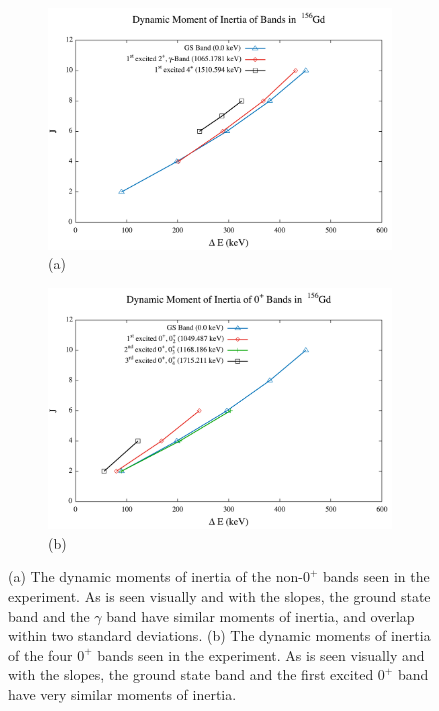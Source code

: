 \begin{figure}[!]
    \begin{subfigure}{\textwidth}
    \centering
    \includegraphics[scale=0.4]{Discussion/156_Dynamic.pdf}
    \caption*{(a)}
    \end{subfigure}
    \begin{subfigure}{\textwidth}
    \centering
    \includegraphics[scale=0.4]{Discussion/156_Dynamic0.pdf}
    \caption*{(b)}
    \end{subfigure}
    \caption{(a) The dynamic moments of inertia of the non-$0^+$ bands seen in the experiment. As is seen visually and with the slopes, the ground state band and the $\gamma$ band have similar moments of inertia, and overlap within two standard deviations. (b) The dynamic moments of inertia of the four $0^+$ bands seen in the experiment. As is seen visually and with the slopes, the ground state band and the first excited $0^+$ band have very similar moments of inertia.}
    \label{fig:156_Dynamic}
\end{figure}